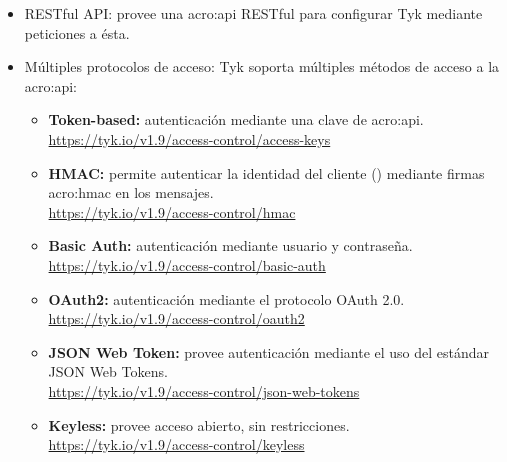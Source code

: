 \begin{itemize}
  \item RESTful API: provee una \gls{acro:api} RESTful para configurar Tyk mediante peticiones a ésta.
  \item Múltiples protocolos de acceso: Tyk soporta múltiples métodos de acceso a la \gls{acro:api}:
  \begin{itemize}
    \item \textbf{Token-based:} autenticación mediante una clave de \gls{acro:api}. \\
    \url{https://tyk.io/v1.9/access-control/access-keys}
    \item \textbf{HMAC:} permite autenticar la identidad del cliente () mediante firmas \gls{acro:hmac} en los mensajes. \\
    \url{https://tyk.io/v1.9/access-control/hmac}
    \item \textbf{Basic Auth:} autenticación mediante usuario y contraseña. \\
    \url{https://tyk.io/v1.9/access-control/basic-auth}
    \item \textbf{OAuth2:} autenticación mediante el protocolo OAuth 2.0. \\
    \url{https://tyk.io/v1.9/access-control/oauth2}
    \item \textbf{JSON Web Token:} provee autenticación mediante el uso del estándar JSON Web Tokens. \\
    \url{https://tyk.io/v1.9/access-control/json-web-tokens}
    \item \textbf{Keyless:} provee acceso abierto, sin restricciones. \\
    \url{https://tyk.io/v1.9/access-control/keyless}
  \end{itemize}


\end{itemize}
